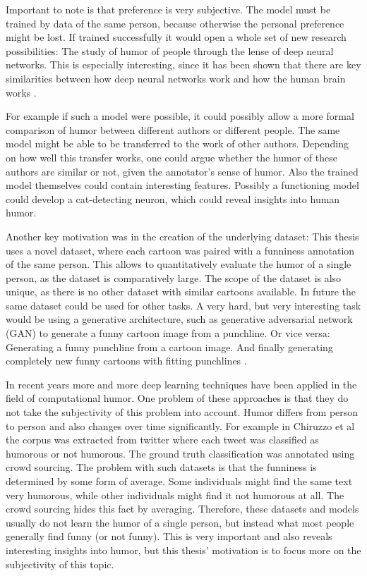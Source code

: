 \documentclass[draft,final,oneside]{vutinfth} %
\begin{document}
Important to note is that preference is very subjective. The model must be trained by data of the same person, because otherwise the personal preference might be lost. If trained successfully it would open a whole set of new research possibilities: The study of humor of people through the lense of deep neural networks. This is especially interesting, since it has been shown that there are key similarities between how deep neural networks work and how the human brain works \cite{Cichy2016}.

For example if such a model were possible, it could possibly allow a more formal comparison of humor between different authors or different people.
The same model might be able to be transferred to the work of other authors. Depending on how well this transfer works, one could argue whether the humor of these authors are similar or not, given the annotator's sense of humor. Also the trained model themselves could contain interesting features. Possibly a functioning model could develop a cat-detecting neuron, which could reveal insights into human humor.

Another key motivation was in the creation of the underlying dataset: This thesis uses a novel dataset, where each cartoon was paired with a funniness annotation of the same person. This allows to quantitatively evaluate the humor of a single person, as the dataset is comparatively large. The scope of the dataset is also unique, as there is no other dataset with similar cartoons available. In future the same dataset could be used for other tasks. A very hard, but very interesting task would be using a generative architecture, such as generative adversarial network (GAN) to generate a funny cartoon image from a punchline. Or vice versa: Generating a funny punchline from a cartoon image. And finally generating completely new funny cartoons with fitting punchlines \cite{gan2}\cite{gan}.

In recent years more and more deep learning techniques have been applied in the field of computational humor. One problem of these approaches is that they do not take the subjectivity of this problem into account. Humor differs from person to person and also changes over time significantly. For example in Chiruzzo et al \cite{chiruzzo2019overview} the corpus was extracted from twitter where each tweet was classified as humorous or not humorous. The ground truth classification was annotated using crowd sourcing. The problem with such datasets is that the funniness is determined by some form of average. Some individuals might find the same text very humorous, while other individuals might find it not humorous at all. The crowd sourcing hides this fact by averaging. Therefore, these datasets and models usually do not learn the humor of a single person, but instead what most people generally find funny (or not funny). This is very important and also reveals interesting insights into humor, but this thesis' motivation is to focus more on the subjectivity of this topic.
\end{document}
